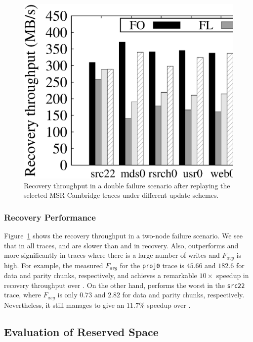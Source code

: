 \begin{figure}[t]
    \centering
    \includegraphics[width=0.8\linewidth]{charts/msr_recovery/eps/msr_recovery}
    \caption{Recovery throughput in a double failure scenario after replaying
        the selected MSR Cambridge traces under different update schemes.}
    \label{fig:msr_recovery}
\end{figure}

\subsubsection{Recovery Performance} Figure~\ref{fig:msr_recovery} shows the
recovery throughput in a two-node failure scenario. We see that in all traces,
\FL and \PL are slower than \FO and \PLR in recovery.   Also, \PLR outperforms
\FL and \PL more significantly in traces where there is a large number of
writes and $F_{avg}$ is high.  For example, the measured $F_{avg}$ for the
\texttt{proj0} trace is $45.66$ and $182.6$ for data and parity chunks, 
respectively, and \PLR achieves a remarkable ${10\times}$ speedup in recovery
throughput over \FL.  On the other hand, \PLR performs the worst in the
\texttt{src22} trace, where $F_{avg}$ is only $0.73$ and $2.82$ for data and
parity chunks, respectively.  Nevertheless, it still manages to give an
${11.7}\%$ speedup over \FL.

\subsection{Evaluation of Reserved Space}
\label{eval:reserve_evaluation}


